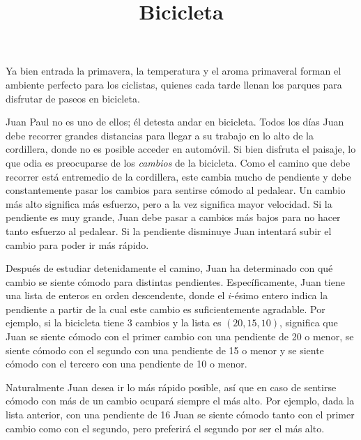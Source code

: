\documentclass{oci}
\title{Bicicleta}
\begin{document}
\begin{problemDescription}
Ya bien entrada la primavera, la temperatura y el aroma primaveral forman el
ambiente perfecto para los ciclistas, quienes cada tarde llenan los parques para
disfrutar de paseos en bicicleta.

Juan Paul no es uno de ellos; él detesta andar en bicicleta.
Todos los días Juan debe recorrer grandes distancias para llegar a su trabajo en
lo alto de la cordillera, donde no es posible acceder en automóvil.
Si bien disfruta el paisaje, lo que odia es preocuparse de los \emph{cambios} de
la bicicleta.
Como el camino que debe recorrer está entremedio de la cordillera, este cambia
mucho de pendiente y debe constantemente pasar los cambios para sentirse cómodo
al pedalear.
Un cambio más alto significa más esfuerzo, pero a la vez significa mayor
velocidad.
Si la pendiente es muy grande, Juan debe pasar a cambios más bajos para no hacer
tanto esfuerzo al pedalear.
Si la pendiente disminuye Juan intentará subir el cambio para poder ir
más rápido.

Después de estudiar detenidamente el camino, Juan ha determinado con qué cambio
se siente cómodo para distintas pendientes.
Específicamente, Juan tiene una lista de enteros en orden descendente, donde el
$i$-ésimo entero indica la pendiente a partir de la cual este cambio es
suficientemente agradable.
Por ejemplo, si la bicicleta tiene 3 cambios y la lista es $(20, 15, 10)$,
significa que Juan se siente cómodo con el primer cambio con una pendiente de
20 o menor, se siente cómodo con el segundo con una pendiente de 15 o
menor y se siente cómodo con el tercero con una pendiente de 10 o menor.

Naturalmente Juan desea ir lo más rápido posible, así que en caso de sentirse
cómodo con más de un cambio ocupará siempre el más alto.
Por ejemplo, dada la lista anterior, con una pendiente de 16 Juan se siente cómodo
tanto con el primer cambio como con el segundo, pero preferirá el segundo por
ser el más alto.


\end{problemDescription}
\end{document}
